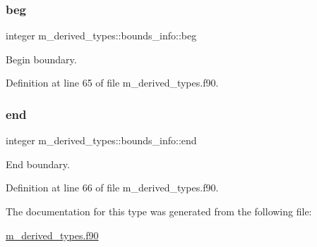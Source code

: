 \subsubsection{\texorpdfstring{beg}{beg}}
{\footnotesize\ttfamily integer m\+\_\+derived\+\_\+types\+::bounds\+\_\+info\+::beg}



Begin boundary. 



Definition at line 65 of file m\+\_\+derived\+\_\+types.\+f90.

\mbox{\label{structm__derived__types_1_1bounds__info_a7bc03a7a90da94d38e6656d65281bc35}} 
\subsubsection{\texorpdfstring{end}{end}}
{\footnotesize\ttfamily integer m\+\_\+derived\+\_\+types\+::bounds\+\_\+info\+::end}



End boundary. 



Definition at line 66 of file m\+\_\+derived\+\_\+types.\+f90.



The documentation for this type was generated from the following file\+:\begin{DoxyCompactItemize}
\item 
\hyperlink{m__derived__types_8f90}{m\+\_\+derived\+\_\+types.\+f90}\end{DoxyCompactItemize}
